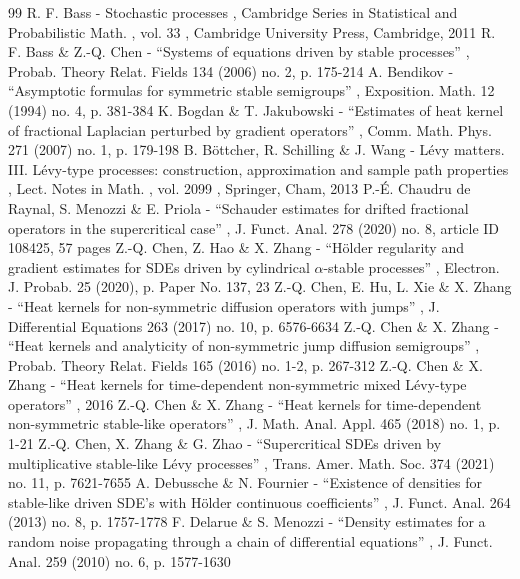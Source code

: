 \documentclass[11pt]{article}
\numberwithin{equation}{section}\providecommand{\asymp}{\mathrel{\sim}}
\theoremstyle{plain}
\theoremstyle{definition}
\newcommand\1{{\mathbf{1}}}
\begin{document}

\begin{thebibliography}{99}
 R. F. Bass - Stochastic processes , Cambridge Series in Statistical and Probabilistic Math. , vol. 33 , Cambridge University Press, Cambridge, 2011
 R. F. Bass \& Z.-Q. Chen - “Systems of equations driven by stable processes” , Probab. Theory Relat. Fields 134 (2006) no. 2, p. 175-214
 A. Bendikov - “Asymptotic formulas for symmetric stable semigroups” , Exposition. Math. 12 (1994) no. 4, p. 381-384
 K. Bogdan \& T. Jakubowski - “Estimates of heat kernel of fractional Laplacian perturbed by gradient operators” , Comm. Math. Phys. 271 (2007) no. 1, p. 179-198
 B. Böttcher, R. Schilling \& J. Wang - Lévy matters. III. Lévy-type processes: construction, approximation and sample path properties , Lect. Notes in Math. , vol. 2099 , Springer, Cham, 2013
 P.-É. Chaudru de Raynal, S. Menozzi \& E. Priola - “Schauder estimates for drifted fractional operators in the supercritical case” , J. Funct. Anal. 278 (2020) no. 8, article ID 108425, 57 pages
 Z.-Q. Chen, Z. Hao \& X. Zhang - “Hölder regularity and gradient estimates for SDEs driven by cylindrical $\alpha $-stable processes” , Electron. J. Probab. 25 (2020), p. Paper No. 137, 23
 Z.-Q. Chen, E. Hu, L. Xie \& X. Zhang - “Heat kernels for non-symmetric diffusion operators with jumps” , J. Differential Equations 263 (2017) no. 10, p. 6576-6634
 Z.-Q. Chen \& X. Zhang - “Heat kernels and analyticity of non-symmetric jump diffusion semigroups” , Probab. Theory Relat. Fields 165 (2016) no. 1-2, p. 267-312
 Z.-Q. Chen \& X. Zhang - “Heat kernels for time-dependent non-symmetric mixed Lévy-type operators” , 2016
 Z.-Q. Chen \& X. Zhang - “Heat kernels for time-dependent non-symmetric stable-like operators” , J. Math. Anal. Appl. 465 (2018) no. 1, p. 1-21
 Z.-Q. Chen, X. Zhang \& G. Zhao - “Supercritical SDEs driven by multiplicative stable-like Lévy processes” , Trans. Amer. Math. Soc. 374 (2021) no. 11, p. 7621-7655
 A. Debussche \& N. Fournier - “Existence of densities for stable-like driven SDE’s with Hölder continuous coefficients” , J. Funct. Anal. 264 (2013) no. 8, p. 1757-1778
 F. Delarue \& S. Menozzi - “Density estimates for a random noise propagating through a chain of differential equations” , J. Funct. Anal. 259 (2010) no. 6, p. 1577-1630

\end{thebibliography}
\end{document}
